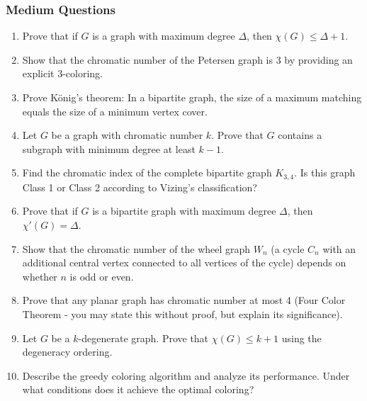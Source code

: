\documentclass{article}
\theoremstyle{definition}
\begin{document}
\subsubsection{Medium Questions}
\begin{enumerate}[start=11]
\item Prove that if $G$ is a graph with maximum degree $\Delta$, then $\chi(G) \leq \Delta + 1$.

\item Show that the chromatic number of the Petersen graph is 3 by providing an explicit 3-coloring.

\item Prove König's theorem: In a bipartite graph, the size of a maximum matching equals the size of a minimum vertex cover.

\item Let $G$ be a graph with chromatic number $k$. Prove that $G$ contains a subgraph with minimum degree at least $k-1$.

\item Find the chromatic index of the complete bipartite graph $K_{3,4}$. Is this graph Class 1 or Class 2 according to Vizing's classification?

\item Prove that if $G$ is a bipartite graph with maximum degree $\Delta$, then $\chi'(G) = \Delta$.

\item Show that the chromatic number of the wheel graph $W_n$ (a cycle $C_n$ with an additional central vertex connected to all vertices of the cycle) depends on whether $n$ is odd or even.

\item Prove that any planar graph has chromatic number at most 4 (Four Color Theorem - you may state this without proof, but explain its significance).

\item Let $G$ be a $k$-degenerate graph. Prove that $\chi(G) \leq k + 1$ using the degeneracy ordering.

\item Describe the greedy coloring algorithm and analyze its performance. Under what conditions does it achieve the optimal coloring?
\end{enumerate}
\end{document}
